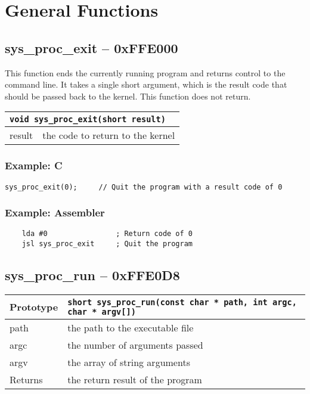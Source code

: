 \section{General Functions}

\subsection*{sys\_proc\_exit -- 0xFFE000}
This function ends the currently running program and returns control to the command line. It takes a single short argument, which is the result code that should be passed back to the kernel. This function does not return.


\begin{tabular}{|l|l|} \hline
\multicolumn{2}{|l|}{\lstinline!void sys_proc_exit(short result)!} \\ \hline\hline
result    & the code to return to the kernel \\ \hline
\end{tabular}


\subsubsection*{Example: C}
\begin{lstlisting}
sys_proc_exit(0);     // Quit the program with a result code of 0
\end{lstlisting}

\subsubsection*{Example: Assembler}
\begin{verbatim}
	lda #0                ; Return code of 0
	jsl sys_proc_exit     ; Quit the program
\end{verbatim}

\subsection*{sys\_proc\_run -- 0xFFE0D8}
\begin{tabular}{|l||l|} \hline
Prototype & \lstinline!short sys_proc_run(const char * path, int argc, char * argv[])! \\ \hline
path & the path to the executable file \\ \hline
argc & the number of arguments passed \\ \hline
argv & the array of string arguments \\ \hline
Returns & the return result of the program \\ \hline
\end{tabular}

